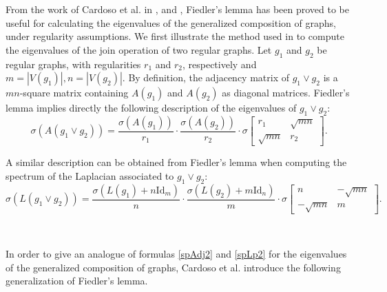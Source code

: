 \documentclass[11pt]{article}
\theoremstyle{definition}
\begin{document}
From the work of Cardoso et al. in \cite{Cardoso2011}, \cite{Cardoso2013} and \cite{Cardoso2022}, Fiedler's lemma has been proved to be useful for calculating the eigenvalues of the generalized composition of graphs, under regularity assumptions. We first illustrate the method used in \cite{Cardoso2013} to compute the eigenvalues of the join operation of two regular graphs. Let $g_1$ and $g_2$ be regular graphs, with regularities $r_1$ and $r_2$, respectively and $m =|V(g_1)|, n=|V(g_2)|$. By definition, the adjacency matrix of $g_1 \vee g_2$ is a $mn$-square matrix containing $A(g_1)$ and $A(g_2)$ as diagonal matrices. Fiedler's lemma implies directly the following description of the eigenvalues of $g_1 \vee g_2$:
\begin{equation}\label{spAdj2}
\sigma(A(g_1\vee g_2))=\frac{\sigma(A(g_1))}{r_1}\cdot \frac{\sigma(A(g_2))}{r_2} \cdot \sigma \begin{bmatrix}
    r_1& \sqrt{mn}\\
    \sqrt{mn} & r_2
\end{bmatrix}.
\end{equation}

A similar description can be obtained from Fiedler's lemma when computing the spectrum of the Laplacian associated to $g_1 \vee g_2$:
\begin{equation}\label{spLp2}
\sigma(L(g_1\vee g_2))=\frac{\sigma(L(g_1) + n \text{Id}_m)}{n}\cdot \frac{\sigma(L(g_2) + m \text{Id}_n)}{m} \cdot \sigma \begin{bmatrix}
    n& -\sqrt{mn}\\
    -\sqrt{mn} & m
\end{bmatrix}.
\end{equation}

\

In order to give an analogue of formulas \eqref{spAdj2} and \eqref{spLp2} for the eigenvalues of the generalized composition of graphs, Cardoso et al. introduce the following generalization of Fiedler's lemma.
\end{document}

